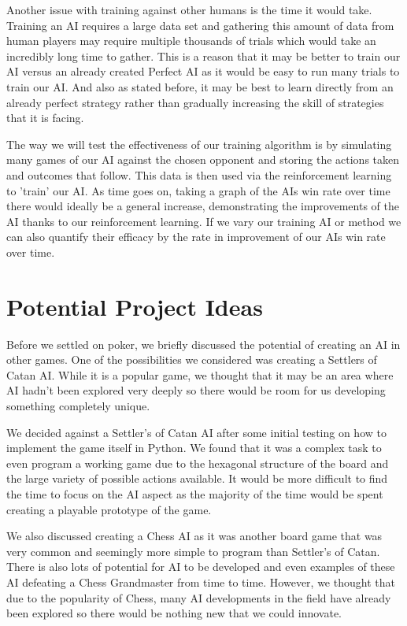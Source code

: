 \documentclass{article}
\begin{document}
\begin{multicols*}{2}
Another issue with training against other humans is the time it would take. Training an AI requires a large data set and gathering this amount of data from human players may require multiple thousands of trials which would take an incredibly long time to gather. This is a reason that it may be better to train our AI versus an already created Perfect AI as it would be easy to run many trials to train our AI. And also as stated before, it may be best to learn directly from an already perfect strategy rather than gradually increasing the skill of strategies that it is facing.

The way we will test the effectiveness of our training algorithm is by simulating many games of our AI against the chosen opponent and storing the actions taken and outcomes that follow. This data is then used via the reinforcement learning to 'train' our AI. As time goes on, taking a graph of the AIs win rate over time there would ideally be a general increase, demonstrating the improvements of the AI thanks to our reinforcement learning. If we vary our training AI or method we can also quantify their efficacy by the rate in improvement of our AIs win rate over time.

\section{Potential Project Ideas}
Before we settled on poker, we briefly discussed the potential of creating an AI in other games. One of the possibilities we considered was creating a Settlers of Catan AI. While it is a popular game, we thought that it may be an area where AI hadn't been explored very deeply so there would be room for us developing something completely unique.
\newline

We decided against a Settler's of Catan AI after some initial testing on how to implement the game itself in Python. We found that it was a complex task to even program a working game due to the hexagonal structure of the board and the large variety of possible actions available. It would be more difficult to find the time to focus on the AI aspect as the majority of the time would be spent creating a playable prototype of the game.
\newline

We also discussed creating a Chess AI as it was another board game that was very common and seemingly more simple to program than Settler's of Catan. There is also lots of potential for AI to be developed and even examples of these AI defeating a Chess Grandmaster from time to time. However, we thought that due to the popularity of Chess, many AI developments in the field have already been explored so there would be nothing new that we could innovate.
\newline


\end{multicols*}
\end{document}
